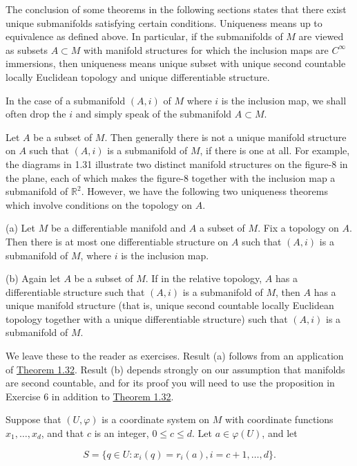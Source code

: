 The conclusion of some theorems in the following sections states that there exist unique submanifolds satisfying certain conditions. Uniqueness means up to equivalence as defined above. In particular, if the submanifolds of $M$ are viewed as subsets $A \subset M$ with manifold structures for which the inclusion maps are $C^{\infty}$ immersions, then uniqueness means unique subset with unique second countable locally Euclidean topology and unique differentiable structure.

In the case of a submanifold $(A,i)$ of $M$ where $i$ is the inclusion map, we shall often drop the $i$ and simply speak of the submanifold $A \subset M$.

Let $A$ be a subset of $M$. Then generally there is not a unique manifold structure on $A$ such that $(A,i)$ is a submanifold of $M$, if there is one at all. For example, the diagrams in 1.31 illustrate two distinct manifold structures on the figure-8 in the plane, each of which makes the figure-8 together with the inclusion map a submanifold of $\mathbb{R}^{2}$. However, we have the following two uniqueness theorems which involve conditions on the topology on $A$.

(a) Let $M$ be a differentiable manifold and $A$ a subset of $M$. Fix a topology on $A$. Then there is at most one differentiable structure on $A$ such that $(A, i)$ is a submanifold of $M$, where $i$ is the inclusion map.

(b) Again let $A$ be a subset of $M$. If in the relative topology, $A$ has a differentiable structure such that $(A,i)$ is a submanifold of $M$, then $A$ has a unique manifold structure (that is, unique second countable locally Euclidean topology together with a unique differentiable structure) such that $(A,i)$ is a submanifold of $M$.

We leave these to the reader as exercises. Result (a) follows from an application of \hyperref[thm:1.32]{Theorem 1.32}. Result (b) depends strongly on our assumption that manifolds are second countable, and for its proof you will need to use the proposition in Exercise 6 in addition to \hyperref[thm:1.32]{Theorem 1.32}.

\label{thm:1.34}
Suppose that $(U,\varphi)$ is a coordinate system on $M$ with coordinate functions $x_1,\ldots,x_d$, and that $c$ is an integer, $0\leq c\leq d$. Let $a\in\varphi(U)$, and let

\begin{equation}
	\tag{1}\label{eq:1.34:1}
	S=\{q\in U\colon x_{i}(q)=r_{i}(a),i=c+1,\ldots,d\}.
\end{equation}

